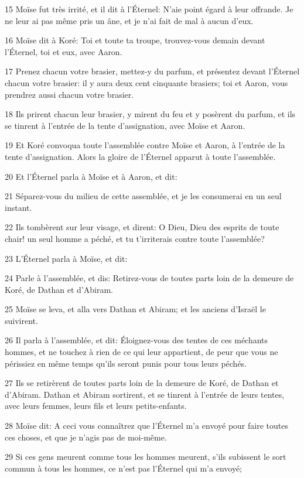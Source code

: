 \par 15 Moïse fut très irrité, et il dit à l'Éternel: N'aie point égard à leur offrande. Je ne leur ai pas même pris un âne, et je n'ai fait de mal à aucun d'eux.
\par 16 Moïse dit à Koré: Toi et toute ta troupe, trouvez-vous demain devant l'Éternel, toi et eux, avec Aaron.
\par 17 Prenez chacun votre brasier, mettez-y du parfum, et présentez devant l'Éternel chacun votre brasier: il y aura deux cent cinquante brasiers; toi et Aaron, vous prendrez aussi chacun votre brasier.
\par 18 Ils prirent chacun leur brasier, y mirent du feu et y posèrent du parfum, et ils se tinrent à l'entrée de la tente d'assignation, avec Moïse et Aaron.
\par 19 Et Koré convoqua toute l'assemblée contre Moïse et Aaron, à l'entrée de la tente d'assignation. Alors la gloire de l'Éternel apparut à toute l'assemblée.
\par 20 Et l'Éternel parla à Moïse et à Aaron, et dit:
\par 21 Séparez-vous du milieu de cette assemblée, et je les consumerai en un seul instant.
\par 22 Ils tombèrent sur leur visage, et dirent: O Dieu, Dieu des esprits de toute chair! un seul homme a péché, et tu t'irriterais contre toute l'assemblée?
\par 23 L'Éternel parla à Moïse, et dit:
\par 24 Parle à l'assemblée, et dis: Retirez-vous de toutes parts loin de la demeure de Koré, de Dathan et d'Abiram.
\par 25 Moïse se leva, et alla vers Dathan et Abiram; et les anciens d'Israël le suivirent.
\par 26 Il parla à l'assemblée, et dit: Éloignez-vous des tentes de ces méchants hommes, et ne touchez à rien de ce qui leur appartient, de peur que vous ne périssiez en même temps qu'ils seront punis pour tous leurs péchés.
\par 27 Ils se retirèrent de toutes parts loin de la demeure de Koré, de Dathan et d'Abiram. Dathan et Abiram sortirent, et se tinrent à l'entrée de leurs tentes, avec leurs femmes, leurs fils et leurs petits-enfants.
\par 28 Moïse dit: A ceci vous connaîtrez que l'Éternel m'a envoyé pour faire toutes ces choses, et que je n'agis pas de moi-même.
\par 29 Si ces gens meurent comme tous les hommes meurent, s'ils subissent le sort commun à tous les hommes, ce n'est pas l'Éternel qui m'a envoyé;
